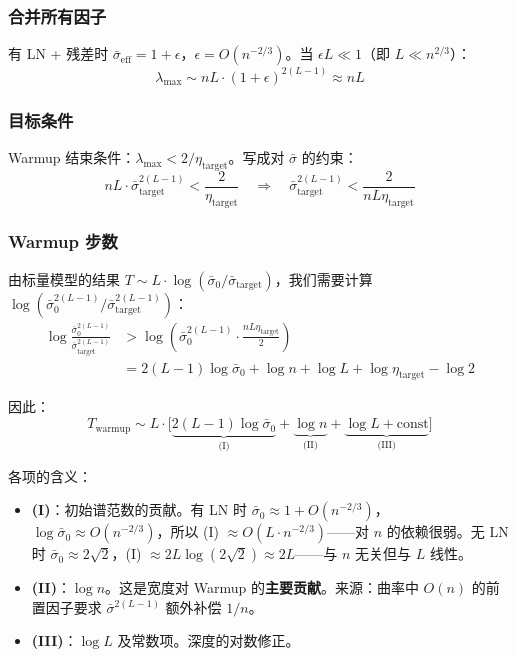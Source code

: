 \documentclass[12pt, a4paper]{ctexart}
\begin{document}
\subsubsection{合并所有因子}

有 LN + 残差时 $\bar{\sigma}_{\text{eff}} = 1 + \epsilon$，$\epsilon = O(n^{-2/3})$。当 $\epsilon L \ll 1$（即 $L \ll n^{2/3}$）：
\begin{equation}
    \lambda_{\max} \sim nL \cdot (1+\epsilon)^{2(L-1)} \approx nL
\end{equation}

\subsubsection{目标条件}

Warmup 结束条件：$\lambda_{\max} < 2/\eta_{\text{target}}$。写成对 $\bar{\sigma}$ 的约束：
\begin{equation}
    nL \cdot \bar{\sigma}_{\text{target}}^{2(L-1)} < \frac{2}{\eta_{\text{target}}} \quad \Rightarrow \quad \bar{\sigma}_{\text{target}}^{2(L-1)} < \frac{2}{nL\eta_{\text{target}}}
\end{equation}

\subsubsection{Warmup 步数}

由标量模型的结果 $T \sim L \cdot \log(\bar{\sigma}_0/\bar{\sigma}_{\text{target}})$，我们需要计算 $\log(\bar{\sigma}_0^{2(L-1)}/\bar{\sigma}_{\text{target}}^{2(L-1)})$：
\begin{align}
    \log\frac{\bar{\sigma}_0^{2(L-1)}}{\bar{\sigma}_{\text{target}}^{2(L-1)}} &> \log\left(\bar{\sigma}_0^{2(L-1)} \cdot \frac{nL\eta_{\text{target}}}{2}\right) \\
    &= 2(L-1)\log\bar{\sigma}_0 + \log n + \log L + \log\eta_{\text{target}} - \log 2
\end{align}

因此：
\begin{equation}
    T_{\text{warmup}} \sim L \cdot \bigl[\underbrace{2(L-1)\log\bar{\sigma}_0}_{\text{(I)}} + \underbrace{\log n}_{\text{(II)}} + \underbrace{\log L + \text{const}}_{\text{(III)}}\bigr]
\end{equation}

各项的含义：
\begin{itemize}
    \item \textbf{(I)}：初始谱范数的贡献。有 LN 时 $\bar{\sigma}_0 \approx 1 + O(n^{-2/3})$，$\log\bar{\sigma}_0 \approx O(n^{-2/3})$，所以 (I) $\approx O(L \cdot n^{-2/3})$——对 $n$ 的依赖很弱。无 LN 时 $\bar{\sigma}_0 \approx 2\sqrt{2}$，(I) $\approx 2L\log(2\sqrt{2}) \approx 2L$——与 $n$ 无关但与 $L$ 线性。
    \item \textbf{(II)}：$\log n$。这是宽度对 Warmup 的\textbf{主要贡献}。来源：曲率中 $O(n)$ 的前置因子要求 $\bar{\sigma}^{2(L-1)}$ 额外补偿 $1/n$。
    \item \textbf{(III)}：$\log L$ 及常数项。深度的对数修正。
\end{itemize}
\end{document}
